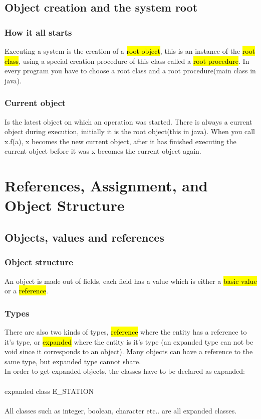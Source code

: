 \documentclass[11pt]{article}
\begin{document}
\subsection{Object creation and the system root}
\subsubsection{How it all starts}
Executing a system is the creation of a \hl{root object}, this is an instance of the \hl{root class}, using a special creation procedure of this class called a \hl{root procedure}. In every program you have to choose a root class and a root procedure(main class in java).
\subsubsection{Current object}
Is the latest object on which an operation was started. There is always a current object during execution, initially it is the root object(this in java). When you call x.f(a), x becomes the new current object, after it has finished executing the current object before it was x becomes the current object again.

\section{References, Assignment, and Object Structure}
\subsection{Objects, values and references}
\subsubsection{Object structure}
An object is made out of fields, each field has a value which is either a \hl{basic value} or a \hl{reference}.
\subsubsection{Types} There are also two kinds of types, \hl{reference} where the entity has a reference to it's type, or \hl{expanded} where the entity is it's type (an expanded type can not be void since it corresponds to an object). Many objects can have a reference to the same type, but expanded type cannot share.\\ In order to get expanded objects, the classes have to be declared as expanded:\\\\ expanded class E\_STATION\\\\All classes such as integer, boolean, character etc.. are all expanded classes.
\end{document}
